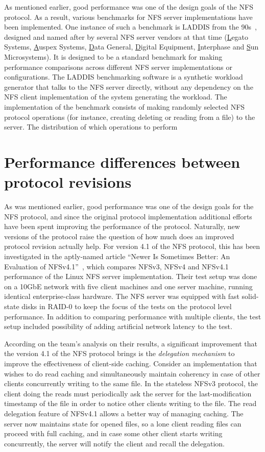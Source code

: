 As mentioned earlier, good performance was one of the design goals of the NFS protocol.
As a result, various benchmarks for NFS server implementations have been implemented.
One instance of such a benchmark is LADDIS from the 90s~\cite{LADDIS}, designed and named after by
several NFS server vendors at that time (\underline{L}egato Systems, \underline{A}uspex Systems, \underline{D}ata General,
\underline{D}igital Equipment, \underline{I}nterphase and \underline{S}un Microsystems).
It is designed to be a standard benchmark for making performance comparisons across different NFS server implementations
or configurations.
The LADDIS benchmarking software is a synthetic workload generator that talks to the NFS server directly,
without any dependency on the NFS client implementation of the system generating the workload.
The implementation of the benchmark consists of making randomly selected NFS protocol operations
(for instance, creating deleting or reading from a file)
to the server.
The distribution of which operations to perform

\section{Performance differences between protocol revisions}

As was mentioned earlier, good performance was one of the design goals for the NFS protocol,
and since the original protocol implementation additional efforts have been spent improving the performance of the protocol.
Naturally, new versions of the protocol raise the question of how much does an improved protocol revision actually help.
For version 4.1 of the NFS protocol, this has been investigated in the aptly-named article ``Newer Is Sometimes Better: An Evaluation of NFSv4.1''~\cite{NFSv4Better}, which compares NFSv3, NFSv4 and NFSv4.1 performance of the Linux NFS server implementation.
Their test setup was done on a 10GbE network with five client machines and one server machine, running identical enterprise-class hardware.
The NFS server was equipped with fast solid-state disks in RAID-0 to keep the focus of the tests on the protocol level performance.
In addition to comparing performance with multiple clients, the test setup included possibility of adding artificial network latency to the test.

According on the team's analysis on their results, a significant improvement that the version 4.1 of the NFS protocol brings is the \emph{delegation
mechanism} to improve the effectiveness of client-side caching.
Consider an implementation that wishes to do read caching and simultaneously maintain coherency in case of other clients
concurrently writing to the same file.
In the stateless NFSv3 protocol, the client doing the reads must periodically ask the server for the last-modification timestamp of the file in order to notice other clients writing to the file.
The read delegation feature of NFSv4.1 allows a better way of managing caching.
The server now maintains state for opened files, so a lone client reading files can proceed with full caching,
and in case some other client starts writing concurrently, the server will notify the client and recall the delegation.

